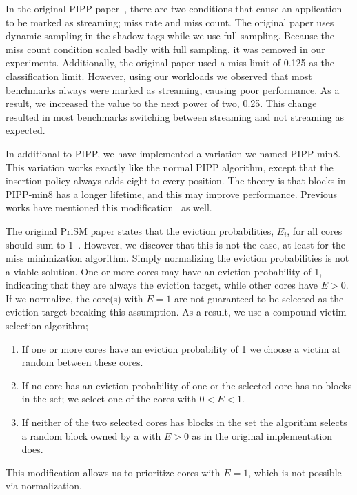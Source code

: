 In the original PIPP paper~\cite{Xie2009}, there are two conditions that cause an application to be marked as streaming; miss rate and miss count.
The original paper uses dynamic sampling in the shadow tags while we use full sampling.
Because the miss count condition scaled badly with full sampling, it was removed in our experiments.
Additionally, the original paper used a miss limit of 0.125 as the classification limit.
However, using our workloads we observed that most benchmarks always were marked as streaming, causing poor performance.
As a result, we increased the value to the next power of two, 0.25.
This change resulted in most benchmarks switching between streaming and not streaming as expected.

In additional to PIPP, we have implemented a variation we named PIPP-min8.
This variation works exactly like the normal PIPP algorithm, except that the insertion policy always adds eight to every position.
The theory is that blocks in PIPP-min8 has a longer lifetime, and this may improve performance.
Previous works have mentioned this modification~\cite{Manikantan2012} as well.

The original PriSM paper states that the eviction probabilities, $E_i$, for all cores should sum to 1~\cite{Manikantan2012}.
However, we discover that this is not the case, at least for the miss minimization algorithm.
Simply normalizing the eviction probabilities is not a viable solution.
One or more cores may have an eviction probability of 1, indicating that they are always the eviction target, while other cores have $E > 0$.
If we normalize, the core(s) with $E=1$ are not guaranteed to be selected as the eviction target breaking this assumption.
As a result, we use a compound victim selection algorithm;
\begin{enumerate}
\item If one or more cores have an eviction probability of 1 we choose a victim at random between these cores.
\item If no core has an eviction probability of one or the selected core has no blocks in the set; we select one of the cores with $0 < E < 1$.
\item If neither of the two selected cores has blocks in the set the algorithm selects a random block owned by a with $E > 0$ as in the original implementation does.
\end{enumerate}
This modification allows us to prioritize cores with $E = 1$, which is not possible via normalization.